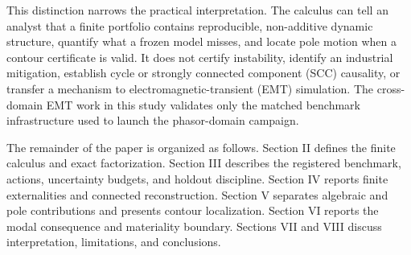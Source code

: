 This distinction narrows the practical interpretation. The calculus can tell
an analyst that a finite portfolio contains reproducible, non-additive dynamic
structure, quantify what a frozen model misses, and locate pole motion when a
contour certificate is valid. It does not certify instability, identify an
industrial mitigation, establish cycle or strongly connected component
(SCC) causality, or transfer a mechanism to electromagnetic-transient (EMT)
simulation. The cross-domain EMT work in this study validates only the matched
benchmark infrastructure used to launch the phasor-domain campaign.

The remainder of the paper is organized as follows. Section II defines the
finite calculus and exact factorization. Section III describes the registered
benchmark, actions, uncertainty budgets, and holdout discipline. Section IV
reports finite externalities and connected reconstruction. Section V separates
algebraic and pole contributions and presents contour localization. Section VI
reports the modal consequence and materiality boundary. Sections VII and VIII
discuss interpretation, limitations, and conclusions.
